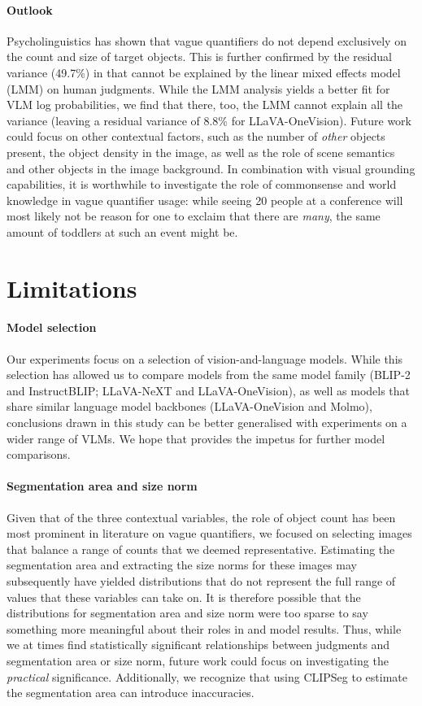 \paragraph{Outlook}
Psycholinguistics has shown that vague quantifiers do not depend exclusively on the count and size of target objects.
This is further confirmed by the residual variance (49.7\%) in \dataset that cannot be explained by the linear mixed effects model (LMM) on human judgments.
While the LMM analysis yields a better fit for VLM log probabilities, we find that there, too, the LMM cannot explain all the variance (leaving a residual variance of 8.8\% for LLaVA-OneVision). 
Future work could focus on other contextual factors, such as the number of \emph{other} objects present, the object density in the image, as well as the role of scene semantics and other objects in the image background. 
In combination with visual grounding capabilities, it is worthwhile to investigate the role of commonsense and world knowledge in vague quantifier usage: 
while seeing 20 people at a conference will most likely not be reason for one to exclaim that there are \emph{many}, the same amount of toddlers at such an event might be.

\section*{Limitations} 
\paragraph{Model selection}
Our experiments focus on a selection of vision-and-language models.
While this selection has allowed us to compare models from the same model family (BLIP-2 and InstructBLIP; LLaVA-NeXT and LLaVA-OneVision), as well as models that share similar language model backbones (LLaVA-OneVision and Molmo), 
conclusions drawn in this study can be better generalised with experiments on a wider range of VLMs. We hope that \dataset provides the impetus for further model comparisons.

\paragraph{Segmentation area and size norm}
Given that of the three contextual variables, the role of object count has been most prominent in literature on vague quantifiers, we focused on selecting images that balance a range of counts that we deemed representative. 
Estimating the segmentation area and extracting the size norms for these images may subsequently have yielded distributions that do not represent the full range of values that these variables can take on.
It is therefore possible that the distributions for segmentation area and size norm were too sparse to say something more meaningful about their roles in \dataset and model results. 
Thus, while we at times find statistically significant relationships between judgments and segmentation area or size norm, future work could focus on investigating the \emph{practical} significance.
Additionally, we recognize that using CLIPSeg to estimate the segmentation area can introduce inaccuracies.

